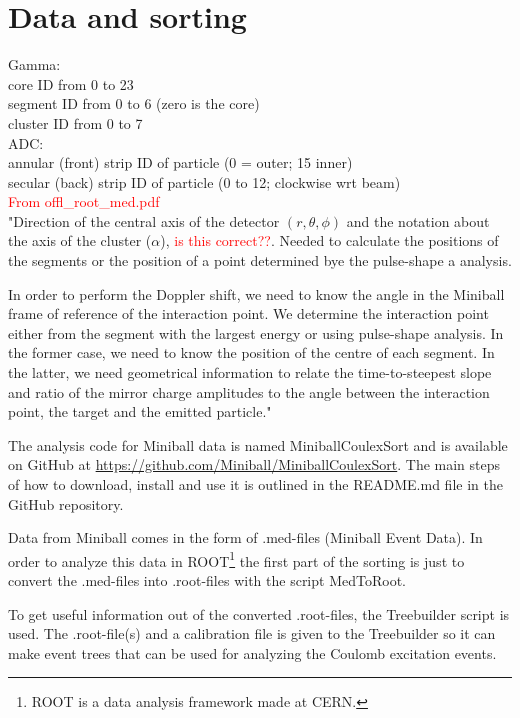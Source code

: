 \documentclass[twoside,english]{uiofysmaster/uiofysmaster}
\begin{document}
\section{Data and sorting}

Gamma: \\
core ID from 0 to 23 \\
segment ID from 0 to 6 (zero is the core) \\
cluster ID from 0 to 7 \\

ADC: \\
annular (front) strip ID of particle (0 = outer; 15 inner) \\
secular (back) strip ID of particle (0 to 12; clockwise wrt beam) \\

\textcolor{red}{From offl\_root\_med.pdf} \\
"Direction of the central axis of the detector $(r, \theta, \phi)$ and the notation about the axis of the cluster ($\alpha$), \textcolor{red}{is this correct??}. Needed to calculate the positions of the segments or the position of a point determined bye the pulse-shape a analysis.

In order to perform the Doppler shift, we need to know the angle in the Miniball frame of reference of the interaction point. We determine the interaction point either from the segment with the largest energy or using pulse-shape analysis. In the former case, we need to know the position of the centre of each segment. In the latter, we need geometrical information to relate the time-to-steepest slope and ratio of the mirror charge amplitudes to the angle between the interaction point, the target and the emitted particle."





The analysis code for Miniball data is named MiniballCoulexSort and is available on GitHub at \url{https://github.com/Miniball/MiniballCoulexSort}. 
The main steps of how to download, install and use it is outlined in the README.md file in the GitHub repository. 

Data from Miniball comes in the form of .med-files (Miniball Event Data). 
In order to analyze this data in ROOT\footnote{ROOT is a data analysis framework made at CERN.} the first part of the sorting is just to convert the .med-files into .root-files with the script MedToRoot. 

To get useful information out of the converted .root-files, the Treebuilder script is used. 
The .root-file(s) and a calibration file is given to the Treebuilder so it can make event trees that can be used for analyzing the Coulomb excitation events. 
\end{document}
